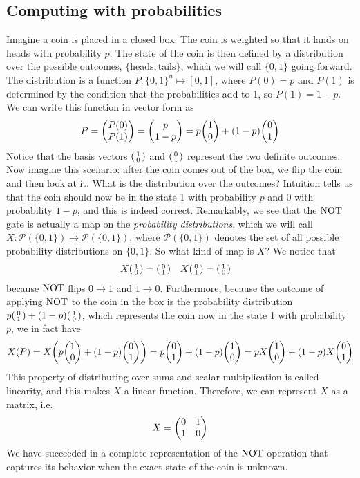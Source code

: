 \documentclass{article}
\newcommand{\NOT}{\ensuremath\text{NOT}}
\begin{document}
\subsection{Computing with probabilities}
Imagine a coin is placed in a closed box. The coin is weighted so that it lands on heads with probability $p$. The state of the coin is then defined by a distribution over the possible outcomes, $\{\text{heads}, \text{tails}\}$, which we will call $\{0, 1\}$ going forward. The distribution is a function $P:\{0,1\}^{n} \mapsto [0,1]$, where $P(0) = p$ and $P(1)$ is determined by the condition that the probabilities add to 1, so $P(1) = 1-p$. We can write this function in vector form as 
$$
P = \mqty(P(0) \\ P(1)) = \mqty(p \\ 1-p) = p\mqty(1 \\ 0) + (1-p)\mqty(0 \\ 1)
$$
Notice that the basis vectors $\smqty(1 \\ 0)$ and $\smqty(0 \\ 1)$ represent the two definite outcomes. Now imagine this scenario: after the coin comes out of the box, we flip the coin and then look at it. What is the distribution over the outcomes? Intuition tells us that the coin should now be in the state 1 with probability $p$ and $0$ with probability $1-p$, and this is indeed correct. Remarkably, we see that the $\NOT$ gate is actually a map on the \textit{probability distributions}, which we will call $X:\mathcal P(\{0,1\}) \to \mathcal P(\{0,1\})$, where $\mathcal P(\{0,1\})$ denotes the set of all possible probability distributions on $\{0,1\}$. So what kind of map is $X$? We notice that 
\begin{align*}
    X\smqty(1 \\ 0) &= \smqty(0 \\ 1) & X\smqty(0 \\ 1) &= \smqty(1 \\ 0)
\end{align*}
because $\NOT$ flips $0 \to 1$ and $1\to 0$. Furthermore, because the outcome of applying $\NOT$ to the coin in the box is the probability distribution $p\smqty(0 \\ 1) + (1-p)\smqty(1 \\ 0)$, which represents the coin now in the state 1 with probability $p$, we in fact have
$$
X(P) = X\qty(p\mqty(1 \\ 0) + (1-p)\mqty(0 \\ 1)) = p\mqty(0 \\ 1) + (1-p)\mqty(1 \\ 0) = pX\mqty(1 \\ 0) + (1-p)X\mqty( 0 \\ 1)
$$
This property of distributing over sums and scalar multiplication is called linearity, and this makes $X$ a linear function. Therefore, we can represent $X$ as a matrix, i.e.
$$
X = \mqty(0 & 1 \\ 1 & 0)
$$
We have succeeded in a complete representation of the $\NOT$ operation that captures its behavior when the exact state of the coin is unknown.
\end{document}

